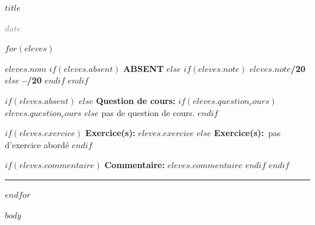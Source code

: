 \documentclass[11pt,a4paper]{article}
\newcommand{\colletitle}{$title$}
\newcommand{\colletitle}{Colle de mathématiques}
\newcommand{\colledate}{$date$}
\newcommand{\colledate}{\today}
\begin{document}

\begin{center}

{\Large\bfseries\color{CPGEblue}\colletitle}


\vspace{0.5em}

{\small\textcolor{gray}{\colledate}}

\end{center}

\vspace{0.7em}


$for(eleves)$

\noindent
\colorbox{CPGElight}{
\parbox{\dimexpr\textwidth-2\fboxsep\relax}{
\textbf{\large $eleves.nom$}
\hfill
$if(eleves.absent)$
\textcolor{CPGEgray}{\textbf{ABSENT}}
$else$
$if(eleves.note)$
\textbf{\large $eleves.note$/20}
$else$
\textbf{\large --/20}
$endif$
$endif$
}}

$if(eleves.absent)$
$else$
\textbf{Question de cours:}
$if(eleves.question_cours)$
$eleves.question_cours$
$else$
\textcolor{CPGEgray}{pas de question de cours.}
$endif$

\vspace{0.25em}

$if(eleves.exercice)$
\textbf{Exercice(s):}
$eleves.exercice$
$else$
\textbf{Exercice(s):}\ \textcolor{CPGEgray}{pas d'exercice abordé}
$endif$

\vspace{0.25em}

$if(eleves.commentaire)$
\textbf{Commentaire:}
$eleves.commentaire$
$endif$
$endif$

\vspace{0.5em}
\hrule
\vspace{0.7em}

$endfor$


$body$
\end{document}
